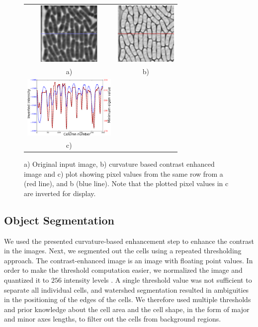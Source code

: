 \documentclass[journal]{IEEEtran}
\begin{document}
\begin{figure}[h]
	\begin{center}
		\begin{tabular}{cc}
			\includegraphics[height=3cm]{orimgmark.png}&\includegraphics[height=3cm]{eigenmark.png}\\
			a) & b)\\
			 \includegraphics[height=3cm]{combineplots.png} &	\\
			 c)&
		\end{tabular}
		\caption{a) Original input image, b) curvature based contrast enhanced image and c) plot showing pixel values from the same row from a (red line), and b (blue line). Note that the plotted pixel values in c are inverted for display.}
		\label{fig:contrastenhance}
	\end{center}
\end{figure}


\subsection{Object Segmentation}
We used the presented curvature-based enhancement step to enhance the contrast in the images. Next, we segmented out the cells using a repeated thresholding approach. The contrast-enhanced image is an image with floating point values. In order to make the threshold computation easier, we normalized the image and quantized it to $256$ intensity levels . A single threshold value was not sufficient to separate all individual cells, and watershed segmentation resulted in ambiguities in the positioning of the edges of the cells. We therefore used multiple thresholds and prior knowledge about the cell area and the cell shape, in the form of major and minor axes lengths,  to filter out the cells from background regions. 
\end{document}
